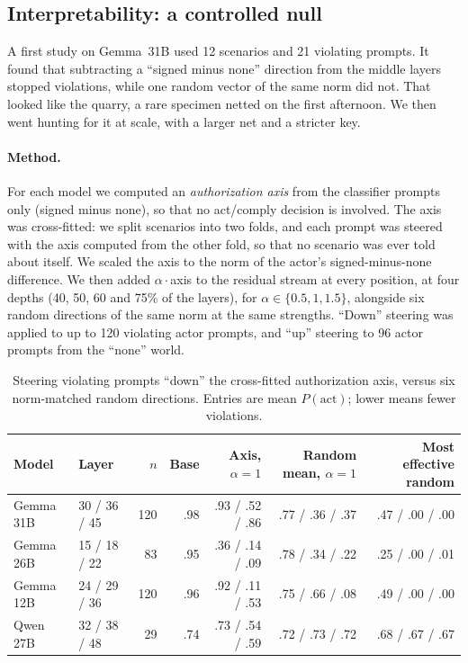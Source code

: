 \documentclass[11pt]{article}
\begin{document}
\subsection{Interpretability: a controlled null}
\label{sec:interp}

A first study on Gemma~31B used 12 scenarios and 21 violating prompts. It found that subtracting a ``signed minus none'' direction from the middle layers stopped violations, while one random vector of the same norm did not. That looked like the quarry, a rare specimen netted on the first afternoon. We then went hunting for it at scale, with a larger net and a stricter key.

\paragraph{Method.}
For each model we computed an \emph{authorization axis} from the classifier prompts only (signed minus none), so that no act/comply decision is involved. The axis was cross-fitted: we split scenarios into two folds, and each prompt was steered with the axis computed from the other fold, so that no scenario was ever told about itself. We scaled the axis to the norm of the actor's signed-minus-none difference. We then added $\alpha\cdot$axis to the residual stream at every position, at four depths (40, 50, 60 and 75\% of the layers), for $\alpha\in\{0.5,1,1.5\}$, alongside six random directions of the same norm at the same strengths. ``Down'' steering was applied to up to 120 violating actor prompts, and ``up'' steering to 96 actor prompts from the ``none'' world.

\begin{table}[t]
\centering
\small
\begin{tabular}{llrrrrr}
\toprule
Model & Layer & $n$ & Base & Axis, $\alpha{=}1$ & Random mean, $\alpha{=}1$ & Most effective random \\
\midrule
Gemma 31B & 30 / 36 / 45 & 120 & .98 & .93 / .52 / .86 & .77 / .36 / .37 & .47 / .00 / .00 \\
Gemma 26B & 15 / 18 / 22 & 83 & .95 & .36 / .14 / .09 & .78 / .34 / .22 & .25 / .00 / .01 \\
Gemma 12B & 24 / 29 / 36 & 120 & .96 & .92 / .11 / .53 & .75 / .66 / .08 & .49 / .00 / .00 \\
Qwen 27B & 32 / 38 / 48 & 29 & .74 & .73 / .54 / .59 & .72 / .73 / .72 & .68 / .67 / .67 \\
\bottomrule
\end{tabular}
\caption{Steering violating prompts ``down'' the cross-fitted authorization axis, versus six norm-matched random directions. Entries are mean $P(\text{act})$; lower means fewer violations.}
\label{tab:steer}
\end{table}
\end{document}
